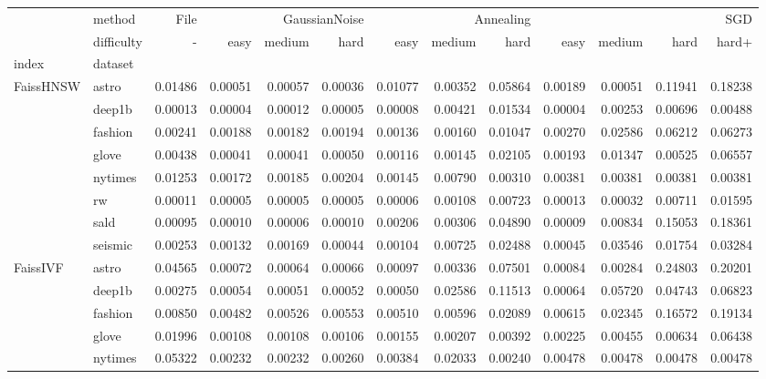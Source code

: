 \begin{tabular}{llrrrrrrrrrrr}
\toprule
 & method & File & \multicolumn{3}{r}{GaussianNoise} & \multicolumn{3}{r}{Annealing} & \multicolumn{4}{r}{SGD} \\
 & difficulty & - & easy & medium & hard & easy & medium & hard & easy & medium & hard & hard+ \\
index & dataset &  &  &  &  &  &  &  &  &  &  &  \\
\midrule
\multirow[t]{8}{*}{FaissHNSW} & astro & 0.01486 & 0.00051 & 0.00057 & 0.00036 & 0.01077 & 0.00352 & 0.05864 & 0.00189 & 0.00051 & 0.11941 & 0.18238 \\
 & deep1b & 0.00013 & 0.00004 & 0.00012 & 0.00005 & 0.00008 & 0.00421 & 0.01534 & 0.00004 & 0.00253 & 0.00696 & 0.00488 \\
 & fashion & 0.00241 & 0.00188 & 0.00182 & 0.00194 & 0.00136 & 0.00160 & 0.01047 & 0.00270 & 0.02586 & 0.06212 & 0.06273 \\
 & glove & 0.00438 & 0.00041 & 0.00041 & 0.00050 & 0.00116 & 0.00145 & 0.02105 & 0.00193 & 0.01347 & 0.00525 & 0.06557 \\
 & nytimes & 0.01253 & 0.00172 & 0.00185 & 0.00204 & 0.00145 & 0.00790 & 0.00310 & 0.00381 & 0.00381 & 0.00381 & 0.00381 \\
 & rw & 0.00011 & 0.00005 & 0.00005 & 0.00005 & 0.00006 & 0.00108 & 0.00723 & 0.00013 & 0.00032 & 0.00711 & 0.01595 \\
 & sald & 0.00095 & 0.00010 & 0.00006 & 0.00010 & 0.00206 & 0.00306 & 0.04890 & 0.00009 & 0.00834 & 0.15053 & 0.18361 \\
 & seismic & 0.00253 & 0.00132 & 0.00169 & 0.00044 & 0.00104 & 0.00725 & 0.02488 & 0.00045 & 0.03546 & 0.01754 & 0.03284 \\
\cline{1-13}
\multirow[t]{8}{*}{FaissIVF} & astro & 0.04565 & 0.00072 & 0.00064 & 0.00066 & 0.00097 & 0.00336 & 0.07501 & 0.00084 & 0.00284 & 0.24803 & 0.20201 \\
 & deep1b & 0.00275 & 0.00054 & 0.00051 & 0.00052 & 0.00050 & 0.02586 & 0.11513 & 0.00064 & 0.05720 & 0.04743 & 0.06823 \\
 & fashion & 0.00850 & 0.00482 & 0.00526 & 0.00553 & 0.00510 & 0.00596 & 0.02089 & 0.00615 & 0.02345 & 0.16572 & 0.19134 \\
 & glove & 0.01996 & 0.00108 & 0.00108 & 0.00106 & 0.00155 & 0.00207 & 0.00392 & 0.00225 & 0.00455 & 0.00634 & 0.06438 \\
 & nytimes & 0.05322 & 0.00232 & 0.00232 & 0.00260 & 0.00384 & 0.02033 & 0.00240 & 0.00478 & 0.00478 & 0.00478 & 0.00478 \\

\end{tabular}
